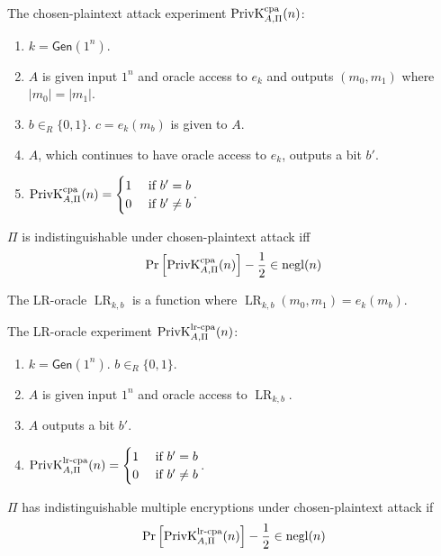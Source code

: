 The chosen-plaintext attack experiment $\PrivKExpt{cpa}{A,\Pi}(n)$:
\begin{enumerate}
\item $k = \mathsf{Gen}(1^n)$.
\item $A$ is given input $1^n$ and oracle access to $e_k$ and outputs $(m_0, m_1)$ where $|m_0| = |m_1|$.
\item $b \in_R \{0, 1\}$. $c = e_k(m_b)$ is given to $A$.
\item $A$, which continues to have oracle access to $e_k$, outputs a bit $b'$.
\item $\PrivKExpt{cpa}{A,\Pi}(n) = \begin{cases}1 & \textrm{ if } b' = b \\ 0 & \textrm{ if } b' \neq b\end{cases}$.
\end{enumerate}

\begin{definition}
$\Pi$ is indistinguishable under chosen-plaintext attack iff
\[ \Pr\left[\PrivKExpt{cpa}{A,\Pi}(n)\right] - \frac{1}{2} \in \operatorname{negl}(n) \]
\end{definition}

\begin{definition}
The LR-oracle $\operatorname{LR}_{k,b}$ is a function where
$\operatorname{LR}_{k,b}(m_0, m_1) = e_k(m_b)$.
\end{definition}

The LR-oracle experiment $\PrivKExpt{lr-cpa}{A,\Pi}(n)$:
\begin{enumerate}
\item $k = \mathsf{Gen}(1^n)$. $b \in_R \{0, 1\}$.
\item $A$ is given input $1^n$ and oracle access to $\operatorname{LR}_{k,b}$.
\item $A$ outputs a bit $b'$.
\item $\PrivKExpt{lr-cpa}{A,\Pi}(n) = \begin{cases}1 & \textrm{ if } b' = b \\ 0 & \textrm{ if } b' \neq b\end{cases}$.
\end{enumerate}

\begin{definition}
$\Pi$ has indistinguishable multiple encryptions under chosen-plaintext attack if
\[ \Pr\left[\PrivKExpt{lr-cpa}{A,\Pi}(n)\right] - \frac{1}{2} \in \operatorname{negl}(n) \]
\end{definition}

